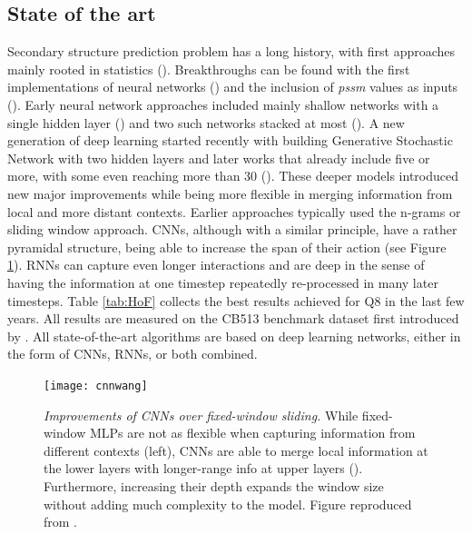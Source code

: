 \subsection{State of the art}
Secondary structure prediction problem has a long history, with first approaches mainly rooted in statistics (\cite{Chou1974}). Breakthroughs can be found with the first implementations of neural networks (\cite{Qian1988}) and the inclusion of \textit{pssm} values as inputs (\cite{Rost1993}). Early neural network approaches included mainly shallow networks with a single hidden layer (\cite{Qian1988,doi:10.1016/0014-5793(88)81066-4,Rost1993}) and two such networks stacked at most (\cite{Jones1999,Dor2007}). A new generation of deep learning started recently with \cite{Zhou2014} building Generative Stochastic Network with two hidden layers and later works that already include five or more, with some even reaching more than 30 (\cite{8371925,Fang2017}). These deeper models introduced new major improvements while being more flexible in merging information from local and more distant contexts. Earlier approaches typically used the n-grams or sliding window approach. CNNs, although with a similar principle, have a rather pyramidal structure, being able to increase the span of their action (see Figure \ref{fig:cnnwang}). RNNs can capture even longer interactions and are deep in the sense of having the information at one timestep repeatedly re-processed in many later timesteps. Table \ref{tab:HoF} collects the best results achieved for Q8 in the last few years. All results are measured on the CB513 benchmark dataset first introduced by \cite{Zhou2014}. All state-of-the-art algorithms are based on deep learning networks, either in the form of CNNs, RNNs, or both combined.

\begin{figure}
	\centering
	\texttt{[image: cnnwang]}
	\caption{\textit{Improvements of CNNs over fixed-window sliding.} While fixed-window MLPs are not as flexible when capturing information from different contexts (left), CNNs are able to merge local information at the lower layers with longer-range info at upper layers (\cite{Busia2017}). Furthermore, increasing their depth expands the window size without adding much complexity to the model. Figure reproduced from \cite{Wang2016}.}
	\label{fig:cnnwang}
\end{figure}

